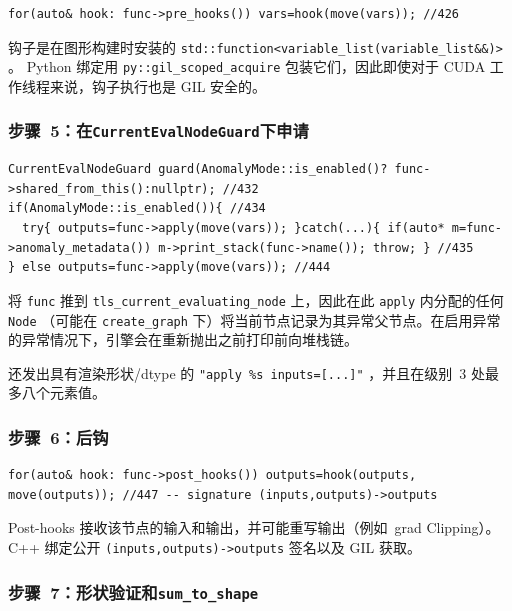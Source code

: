 \begin{lstlisting}[caption={pre-hooks.}, label=lst:prehooks]
for(auto& hook: func->pre_hooks()) vars=hook(move(vars)); //426
\end{lstlisting}

钩子是在图形构建时安装的 \texttt{std::function<variable\_list(variable\_list\&\&)>} 。 Python 绑定用 \texttt{py::gil\_scoped\_acquire} 包装它们，因此即使对于 CUDA 工作线程来说，钩子执行也是 GIL 安全的。

\subsubsection{步骤~5：在\texttt{CurrentEvalNodeGuard}下申请}
\label{subsubsec:apply}

\begin{lstlisting}[caption={apply.}, label=lst:apply]
CurrentEvalNodeGuard guard(AnomalyMode::is_enabled()? func->shared_from_this():nullptr); //432
if(AnomalyMode::is_enabled()){ //434
  try{ outputs=func->apply(move(vars)); }catch(...){ if(auto* m=func->anomaly_metadata()) m->print_stack(func->name()); throw; } //435
} else outputs=func->apply(move(vars)); //444
\end{lstlisting}

将 \texttt{func} 推到 \texttt{tls\_current\_evaluating\_node} 上，因此在此 \texttt{apply} 内分配的任何 \texttt{Node} （可能在 \texttt{create\_graph} 下）将当前节点记录为其异常父节点。在启用异常的异常情况下，引擎会在重新抛出之前打印前向堆栈链。

还发出具有渲染形状/dtype 的 \texttt{"apply \%s inputs=[...]"} ，并且在级别~3 处最多八个元素值。

\subsubsection{步骤~6：后钩}
\label{subsubsec:posthooks}

\begin{lstlisting}[caption={post-hooks.}, label=lst:posthooks]
for(auto& hook: func->post_hooks()) outputs=hook(outputs, move(outputs)); //447 -- signature (inputs,outputs)->outputs
\end{lstlisting}

Post-hooks 接收该节点的输入和输出，并可能重写输出（例如\ grad Clipping）。 C++ 绑定公开 \texttt{(inputs,outputs)->outputs} 签名以及 GIL 获取。

\subsubsection{步骤~7：形状验证和\texttt{sum\_to\_shape}}
\label{subsubsec:sumto}

